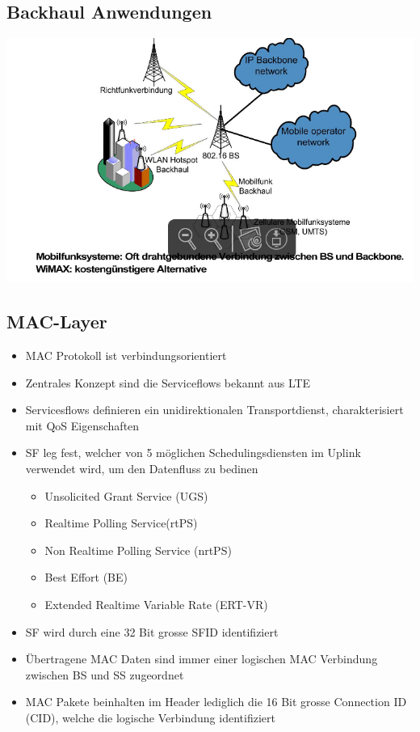 \subsection{Backhaul Anwendungen}
\includegraphics[width = 0.75 \linewidth]{./pics/wimax4.png} 

\subsection{MAC-Layer}

\begin{itemize}
\item MAC Protokoll ist verbindungsorientiert
\item Zentrales Konzept sind die Serviceflows bekannt aus LTE
\item Servicesflows definieren ein unidirektionalen Transportdienst, charakterisiert mit QoS Eigenschaften
\item SF leg fest, welcher von 5 möglichen Schedulingsdiensten im Uplink verwendet wird, um den Datenfluss zu bedinen
\begin{itemize}
\item Unsolicited Grant Service (UGS)
\item Realtime Polling Service(rtPS)
\item Non Realtime Polling Service (nrtPS)
\item Best Effort (BE)
\item Extended Realtime Variable Rate (ERT-VR) 
\end{itemize}
\item SF wird durch eine 32 Bit grosse SFID identifiziert
\item Übertragene MAC Daten sind immer einer logischen MAC Verbindung zwischen BS und SS zugeordnet
\item MAC Pakete beinhalten im Header lediglich die 16 Bit grosse Connection ID (CID), welche die logische Verbindung identifiziert
\end{itemize}

